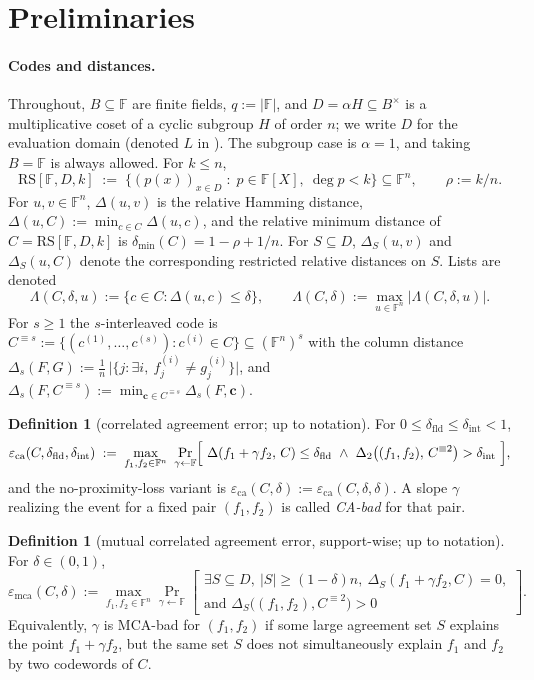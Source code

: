 \documentclass[11pt]{article}
\theoremstyle{definition}
\newtheorem{definition}[theorem]{Definition}
\theoremstyle{remark}
\newcommand{\F}{\mathbb{F}}
\newcommand{\B}{B}
\newcommand{\RS}{\mathrm{RS}}
\newcommand{\eca}{\varepsilon_{\mathrm{ca}}}
\newcommand{\emca}{\varepsilon_{\mathrm{mca}}}
\newcommand{\dmin}{\delta_{\min}}
\newcommand{\dist}{\Delta}
\newcommand{\distS}{\Delta_S}
\newcommand{\Lst}{\Lambda}
\begin{document}
\section{Preliminaries}\label{sec:prelim}

\paragraph{Codes and distances.} Throughout, $\B\subseteq\F$ are finite fields, $q:=|\F|$, and $D=\alpha H\subseteq\B^\times$ is a multiplicative coset of a cyclic subgroup $H$ of order $n$; we write $D$ for the evaluation domain (denoted $L$ in \cite{ABF26}). The subgroup case is $\alpha=1$, and taking $\B=\F$ is always allowed. For $k\le n$,
\[
\RS[\F,D,k]\;:=\;\bigl\{(p(x))_{x\in D}\;:\;p\in\F[X],\ \deg p<k\bigr\}\subseteq\F^n,
\qquad \rho:=k/n .
\]
For $u,v\in\F^n$, $\dist(u,v)$ is the relative Hamming distance, $\dist(u,C):=\min_{c\in C}\dist(u,c)$, and the relative minimum distance of $C=\RS[\F,D,k]$ is $\dmin(C)=1-\rho+1/n$. For $S\subseteq D$, $\distS(u,v)$ and $\distS(u,C)$ denote the corresponding restricted relative distances on $S$. Lists are denoted
\[
\Lst(C,\delta,u):=\{c\in C:\dist(u,c)\le\delta\},\qquad \Lst(C,\delta):=\max_{u\in\F^n}|\Lst(C,\delta,u)| .
\]
For $s\ge1$ the $s$-interleaved code is $C^{\equiv s}:=\{(c^{(1)},\dots,c^{(s)}):c^{(i)}\in C\}\subseteq(\F^n)^s$ with the column distance $\dist_s(F,G):=\frac1n\,\bigl|\{j:\exists i,\ f^{(i)}_j\ne g^{(i)}_j\}\bigr|$, and $\dist_s(F,C^{\equiv s}):=\min_{\mathbf c\in C^{\equiv s}}\dist_s(F,\mathbf c)$.

\begin{definition}[correlated agreement error; {\cite[Def.~4.1]{ABF26}} up to notation]\label{def:ca}
For $0\le\delta_{\mathrm{fld}}\le\delta_{\mathrm{int}}<1$,
\[
\eca(C,\delta_{\mathrm{fld}},\delta_{\mathrm{int}})\;:=\;\max_{f_1,f_2\in\F^n}\ \Pr_{\gamma\leftarrow\F}\Bigl[\ \dist(f_1+\gamma f_2,\,C)\le\delta_{\mathrm{fld}}\ \wedge\ \dist_2\bigl((f_1,f_2),\,C^{\equiv2}\bigr)>\delta_{\mathrm{int}}\ \Bigr],
\]
and the no-proximity-loss variant is $\eca(C,\delta):=\eca(C,\delta,\delta)$. A slope $\gamma$ realizing the event for a fixed pair $(f_1,f_2)$ is called \emph{CA-bad} for that pair.
\end{definition}

\begin{definition}[mutual correlated agreement error, support-wise; {\cite[Def.~4.3]{ABF26}} up to notation]\label{def:mca}
For $\delta\in(0,1)$,
\[
\emca(C,\delta):=\max_{f_1,f_2\in\F^n}\Pr_{\gamma\leftarrow\F}\left[
\begin{array}{l}
\exists S\subseteq D,\ |S|\ge(1-\delta)n,\ \distS(f_1+\gamma f_2,C)=0,\\[2pt]
\text{and }\distS\bigl((f_1,f_2),C^{\equiv2}\bigr)>0
\end{array}
\right].
\]
Equivalently, $\gamma$ is MCA-bad for $(f_1,f_2)$ if some large agreement set $S$ explains the point $f_1+\gamma f_2$, but the same set $S$ does not simultaneously explain $f_1$ and $f_2$ by two codewords of $C$.
\end{definition}
\end{document}
